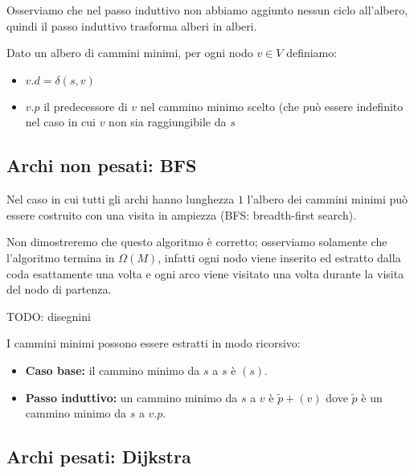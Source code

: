 \documentclass[a4paper,10pt]{amsbook}
\theoremstyle{plain}
\theoremstyle{definition}
\theoremstyle{remark}
\begin{document}
Osserviamo che nel passo induttivo non abbiamo aggiunto nessun ciclo
all'albero, quindi il passo induttivo trasforma alberi in alberi.

Dato un albero di cammini minimi, per ogni nodo $v\in V$ definiamo:
\begin{itemize}
\item $v.d = \delta(s,v)$
\item $v.p$ il predecessore di $v$ nel cammino minimo scelto (che può
  essere indefinito nel caso in cui $v$ non sia raggiungibile da $s$
\end{itemize}

\subsection{Archi non pesati: BFS}

Nel caso in cui tutti gli archi hanno lunghezza $1$ l'albero dei
cammini minimi può essere costruito con una visita in ampiezza (BFS:
breadth-first search).

\begin{algorithmic}
  \EndFor
      \EndIf
    \EndFor
  \EndWhile
\end{algorithmic}

Non dimostreremo che questo algoritmo è corretto; osserviamo solamente
che l'algoritmo termina in $\Omega (M)$, infatti ogni nodo viene
inserito ed estratto dalla coda esattamente una volta e ogni arco
viene visitato una volta durante la visita del nodo di partenza.

TODO: disegnini

I cammini minimi possono essere estratti in modo ricorsivo:
\begin{itemize}
\item \textbf{Caso base:} il cammino minimo da $s$ a $s$ \`e $(s)$.
\item \textbf{Passo induttivo:} un cammino minimo da $s$ a $v$ \`e
  $\tilde p + (v)$ dove $\tilde p$ \`e un cammino minimo da $s$ a $v.p$.
\end{itemize}

\subsection{Archi pesati: Dijkstra}
\end{document}
